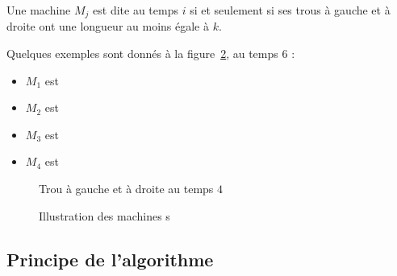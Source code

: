 \documentclass[a4paper,9pt]{article}
\begin{document}
\begin{ndf}
    Une machine $M_j$ est dite  au temps $i$ si et seulement si ses trous à gauche et à
    droite ont une longueur au moins égale à $k$.

    Quelques exemples sont donnés à la figure~\ref{fig:kdisp}, au temps $6$ : 
    \begin{itemize}
        \item $M_1$ est 
        \item $M_2$ est 
        \item $M_3$ est 
        \item $M_4$ est \authmach{\infty}
    \end{itemize}
\end{ndf}

\begin{figure}
    \centering
    \begin{ordo}[10]{1}{1}{12}
    \end{ordo}
    \caption{Trou à gauche et à droite au temps $4$}
    \label{fig:tagtad}
\end{figure}

\begin{figure}
    \centering
    \begin{ordo}[10]{4}{1}{12}





    \end{ordo}
    \caption{Illustration des machines s}
    \label{fig:kdisp}
\end{figure}

\subsection{Principe de l'algorithme}
\end{document}
